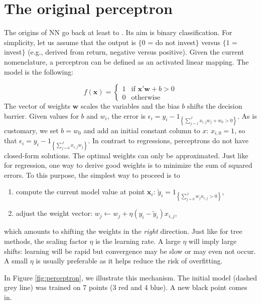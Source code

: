\documentclass[]{krantz}
\providecommand{\tightlist}{%
  \setlength{\itemsep}{0pt}\setlength{\parskip}{0pt}}
\theoremstyle{definition}
\theoremstyle{definition}
\theoremstyle{definition}
\theoremstyle{remark}
\begin{document}
\hypertarget{the-original-perceptron}{%
\section{The original perceptron}\label{the-original-perceptron}}

The origins of NN go back at least to \citet{rosenblatt1958perceptron}.
Its aim is binary classification. For simplicity, let us assume that the
output is \(\{0\) = do not invest\(\}\) versus \(\{1\) = invest\(\}\)
(e.g., derived from return, negative versus positive). Given the current
nomenclature, a perceptron can be defined as an activated linear
mapping. The model is the following:

\[f(\mathbf{x})=\left\{ \begin{array}{lll}
1 & \text{if } \mathbf{x}'\mathbf{w}+b >0\\
0  &\text{otherwise}
\end{array}\right.\] The vector of weights \(\mathbf{w}\) scales the
variables and the bias \(b\) shifts the decision barrier. Given values
for \(b\) and \(w_i\), the error is
\(\epsilon_i=y_i-1_{\left\{\sum_{j=1}^Jx_{i,j}w_j+w_0>0\right\}}\). As
is customary, we set \(b=w_0\) and add an initial constant column to
\(x\): \(x_{i,0}=1\), so that
\(\epsilon_i=y_i-1_{\left\{\sum_{j=0}^Jx_{i,j}w_j\right\}}\). In
contrast to regressions, perceptrons do not have closed-form solutions.
The optimal weights can only be approximated. Just like for regression,
one way to derive good weights is to minimize the sum of squared errors.
To this purpose, the simplest way to proceed is to

\begin{enumerate}
\def\labelenumi{\arabic{enumi}.}
\tightlist
\item
  compute the current model value at point \(\textbf{x}_i\):
  \(\tilde{y}_i=1_{\left\{\sum_{j=0}^Jw_jx_{i,j}>0\right\}}\),
\item
  adjust the weight vector:
  \(w_j \leftarrow w_j + \eta (y_i-\tilde{y}_i)x_{i,j}\),
\end{enumerate}

which amounts to shifting the weights in the \textit{right} direction.
Just like for tree methods, the scaling factor \(\eta\) is the learning
rate. A large \(\eta\) will imply large shifts: learning will be rapid
but convergence may be slow or may even not occur. A small \(\eta\) is
usually preferable as it helps reduce the risk of overfitting.

In Figure \ref{fig:perceptron}, we illustrate this mechanism. The
initial model (dashed grey line) was trained on 7 points (3 red and 4
blue). A new black point comes in.
\end{document}
